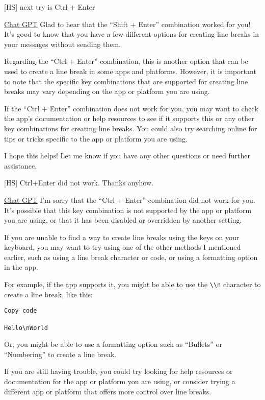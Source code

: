 \documentclass[
]{book}
\theoremstyle{definition}
\theoremstyle{definition}
\theoremstyle{definition}
\theoremstyle{definition}
\theoremstyle{remark}
\begin{document}
{[}HS{]} next try is Ctrl + Enter

\protect\hyperlink{chatgpt}{Chat GPT} Glad to hear that the ``Shift + Enter'' combination worked for you! It's good to know that you have a few different options for creating line breaks in your messages without sending them.

Regarding the ``Ctrl + Enter'' combination, this is another option that can be used to create a line break in some apps and platforms. However, it is important to note that the specific key combinations that are supported for creating line breaks may vary depending on the app or platform you are using.

If the ``Ctrl + Enter'' combination does not work for you, you may want to check the app's documentation or help resources to see if it supports this or any other key combinations for creating line breaks. You could also try searching online for tips or tricks specific to the app or platform you are using.

I hope this helps! Let me know if you have any other questions or need further assistance.

{[}HS{]} Ctrl+Enter did not work. Thanks anyhow.

\protect\hyperlink{chatgpt}{Chat GPT} I'm sorry that the ``Ctrl + Enter'' combination did not work for you. It's possible that this key combination is not supported by the app or platform you are using, or that it has been disabled or overridden by another setting.

If you are unable to find a way to create line breaks using the keys on your keyboard, you may want to try using one of the other methods I mentioned earlier, such as using a line break character or code, or using a formatting option in the app.

For example, if the app supports it, you might be able to use the \texttt{\textbackslash{}\textbackslash{}n} character to create a line break, like this:

\begin{verbatim}
Copy code

Hello\nWorld
\end{verbatim}

Or, you might be able to use a formatting option such as ``Bullets'' or ``Numbering'' to create a line break.

If you are still having trouble, you could try looking for help resources or documentation for the app or platform you are using, or consider trying a different app or platform that offers more control over line breaks.
\end{document}
